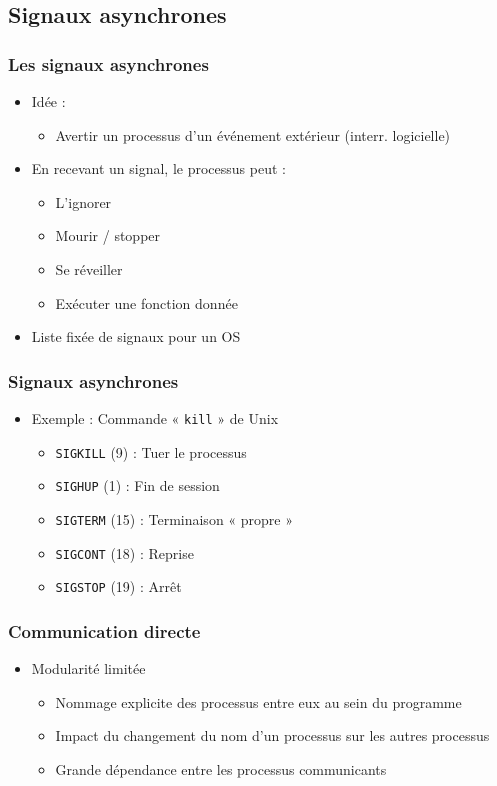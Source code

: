 \subsection{Signaux asynchrones}
\begin{frame}
\frametitle{Les signaux asynchrones}
\begin{itemize}
\item Idée :
\begin{itemize}
\item Avertir un processus d’un événement extérieur (interr. logicielle)
\end{itemize}
\item En recevant un signal, le processus peut :
\begin{itemize}
\item L’ignorer
\item Mourir / stopper
\item Se réveiller
\item Exécuter une fonction donnée
\end{itemize}
\item Liste fixée de signaux pour un OS
\end{itemize}
\end{frame}

\begin{frame}
\frametitle{Signaux asynchrones}
\begin{itemize}
\item Exemple : Commande « \texttt{kill} » de Unix
\begin{itemize}
\item \texttt{SIGKILL} (9) : 	Tuer le processus
\item \texttt{SIGHUP} (1) : 	Fin de session
\item \texttt{SIGTERM} (15) : 	Terminaison « propre »
\item \texttt{SIGCONT} (18) : 	Reprise
\item \texttt{SIGSTOP} (19) : 	Arrêt
\end{itemize}
\end{itemize}
\end{frame}

\begin{frame}
\frametitle{Communication directe}
\begin{itemize}
\item Modularité limitée
\begin{itemize}
\item Nommage explicite des processus entre eux au sein du programme
\item Impact du changement du nom d’un processus sur les autres processus
\item Grande dépendance entre les processus communicants 
\end{itemize}
\end{itemize}
\end{frame}

